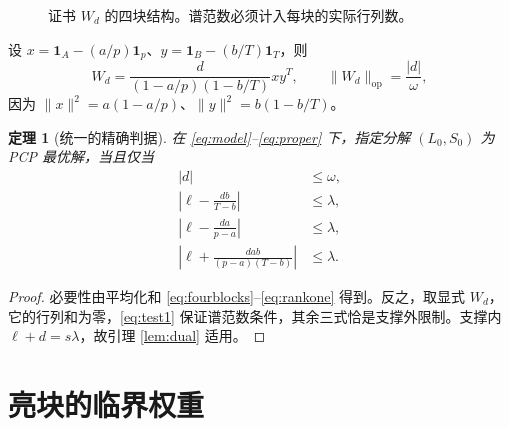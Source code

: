 \documentclass[UTF8,fontset=none,zihao=-4,a4paper]{ctexart}
\theoremstyle{plainzh}
\newtheorem{theorem}{定理}[section]
\newcommand{\one}{\bm 1}
\newcommand{\op}[1]{\lVert #1\rVert_{\mathrm{op}}}
\numberwithin{equation}{section}
\begin{document}
\begin{figure}[htbp]
\centering
{}
\caption{证书 $W_d$ 的四块结构。谱范数必须计入每块的实际行列数。}
\end{figure}

设 $x=\one_A-(a/p)\one_p$、$y=\one_B-(b/T)\one_T$，则
\begin{equation}\label{eq:rankone}
 W_d=\frac{d}{(1-a/p)(1-b/T)}xy^T,\qquad
 \op{W_d}=\frac{|d|}{\omega},
\end{equation}
因为 $\|x\|^2=a(1-a/p)$、$\|y\|^2=b(1-b/T)$。

\begin{theorem}[统一的精确判据]\label{thm:unified}
在 \eqref{eq:model}--\eqref{eq:proper} 下，指定分解 $(L_0,S_0)$ 为 PCP 最优解，当且仅当
\begin{align}
 |d|&\le\omega,\label{eq:test1}\\
 \left|\ell-\frac{db}{T-b}\right|&\le\lambda,\label{eq:test2}\\
 \left|\ell-\frac{da}{p-a}\right|&\le\lambda,\label{eq:test3}\\
 \left|\ell+\frac{dab}{(p-a)(T-b)}\right|&\le\lambda.\label{eq:test4}
\end{align}
\end{theorem}
\begin{proof}
必要性由平均化和 \eqref{eq:fourblocks}--\eqref{eq:rankone} 得到。反之，取显式 $W_d$，它的行列和为零，\eqref{eq:test1} 保证谱范数条件，其余三式恰是支撑外限制。支撑内 $\ell+d=s\lambda$，故引理 \ref{lem:dual} 适用。
\end{proof}

\section{亮块的临界权重}
\end{document}
